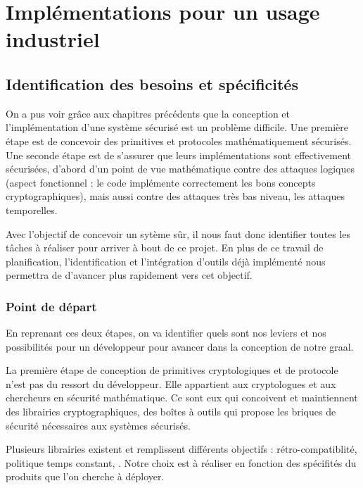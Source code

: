 \chapter{Implémentations pour un usage industriel}
\label{chap:erysichtonConception}




\section{Identification des besoins et spécificités}

On a pus voir grâce aux chapitres précédents que la conception et l'implémentation d'une système sécurisé est un problème difficile. Une première étape est de concevoir des primitives et protocoles mathématiquement sécurisés. Une seconde étape est de s’assurer que leurs implémentations sont effectivement sécurisées, d’abord d’un point de vue mathématique contre des attaques logiques (aspect fonctionnel : le code implémente correctement les bons concepts cryptographiques), mais aussi contre des attaques très bas niveau, les attaques temporelles. \medbreak

Avec l'objectif de concevoir un sytème sûr, il nous faut donc identifier toutes les tâches à réaliser pour arriver à bout de ce projet. En plus de ce travail de planification, l'identification et l'intégration d'outils déjà implémenté nous permettra de d'avancer plus rapidement vers cet objectif.\smallbreak


\subsection*{Point de départ}

En reprenant ces deux étapes, on va identifier quels sont nos leviers et nos possibilités pour un développeur pour avancer dans la conception de notre graal.\smallbreak

La première étape de conception de primitives cryptologiques et de protocole n'est pas du ressort du développeur. Elle appartient aux cryptologues et aux chercheurs en sécurité mathématique. Ce sont eux qui concoivent et maintiennent des librairies cryptographiques, des boîtes à outils qui propose les briques de sécurité nécessaires aux systèmes sécurisés.\medbreak

Plusieurs librairies existent \cite{OpenSSL, BearSSL, polubelova2020haclxn} et remplissent différents objectifs :  rétro-compatiblité, politique temps constant, \etc. Notre choix est à réaliser en fonction des spécifités du produits que l'on cherche à déployer.\medbreak

